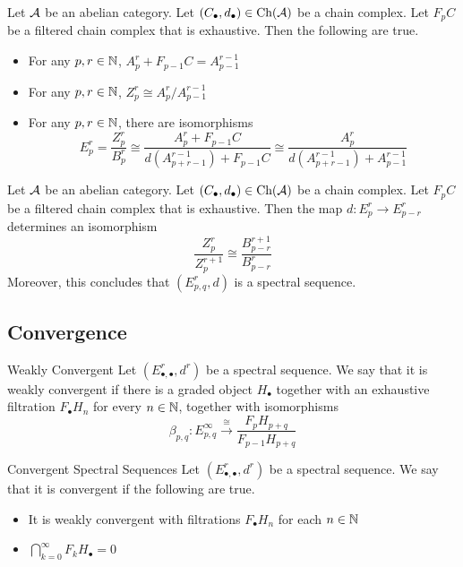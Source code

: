 \documentclass[a4paper]{article}
\begin{document}
\begin{lmm}{}{} Let $\mathcal{A}$ be an abelian category. Let $(C_\bullet,d_\bullet)\in\text{Ch}(\mathcal{A})$ be a chain complex. Let $F_pC$ be a filtered chain complex that is exhaustive. Then the following are true. 
\begin{itemize}
\item For any $p,r\in\mathbb{N}$, $A_p^r+F_{p-1}C=A_{p-1}^{r-1}$
\item For any $p,r\in\mathbb{N}$, $Z_p^r\cong A_p^r/A_{p-1}^{r-1}$
\item For any $p,r\in\mathbb{N}$, there are isomorphisms $$E_p^r=\frac{Z_p^r}{B_p^r}\cong\frac{A_p^r+F_{p-1}C}{d(A_{p+r-1}^{r-1})+F_{p-1}C}\cong\frac{A_p^r}{d(A_{p+r-1}^{r-1})+A_{p-1}^{r-1}}$$
\end{itemize}
\end{lmm}

\begin{thm}{}{} Let $\mathcal{A}$ be an abelian category. Let $(C_\bullet,d_\bullet)\in\text{Ch}(\mathcal{A})$ be a chain complex. Let $F_pC$ be a filtered chain complex that is exhaustive. Then the map $d:E_p^r\to E_{p-r}^r$ determines an isomorphism $$\frac{Z_p^r}{Z_p^{r+1}}\cong\frac{B_{p-r}^{r+1}}{B_{p-r}^r}$$ Moreover, this concludes that $(E_{p,q}^r,d)$ is a spectral sequence. 
\end{thm}

\subsection{Convergence}
\begin{defn}{Weakly Convergent}{} Let $(E_{\bullet,\bullet}^r,d^r)$ be a spectral sequence. We say that it is weakly convergent if there is a graded object $H_\bullet$ together with an exhaustive filtration $F_\bullet H_n$ for every $n\in\mathbb{N}$, together with isomorphisms $$\beta_{p,q}:E_{p,q}^\infty\overset{\cong}{\longrightarrow}\frac{F_pH_{p+q}}{F_{p-1}H_{p+q}}$$
\end{defn}

\begin{defn}{Convergent Spectral Sequences}{} Let $(E_{\bullet,\bullet}^r,d^r)$ be a spectral sequence. We say that it is convergent if the following are true. 
\begin{itemize}
\item It is weakly convergent with filtrations $F_\bullet H_n$ for each $n\in\mathbb{N}$
\item $\bigcap_{k=0}^\infty F_kH_\bullet=0$
\end{itemize}
\end{defn}
\end{document}
